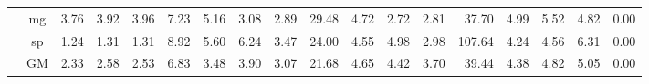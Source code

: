 \begin{table*}[]
\begin{center}
{\begin{tabular}{|c|c|rrrr|rrrr|rrrr|rrrr|}
 &  mg  &  3.76  &  3.92  &  3.96  &   7.23  &  5.16  & \cellcolor{blue!25} 3.08  & \cellcolor{blue!25} 2.89  &  29.48  &  4.72  & \cellcolor{blue!25} 2.72  &  2.81  &   37.70  &  4.99  &  5.52  & \cellcolor{blue!25} 4.82  &   0.00 \\
 &  sp  &  1.24  &  1.31  &  1.31  &   8.92  &  5.60  &  6.24  & \cellcolor{blue!25} 3.47  &  24.00  &  4.55  &  4.98  & \cellcolor{blue!25} 2.98  &  107.64  &  4.24  &  4.56  &  6.31  &   0.00 \\ \cline{2-18}
 &  GM  &  2.33  &  2.58  & \cellcolor{blue!25} 2.53  &   6.83  &  3.48  &  3.90  & \cellcolor{blue!25} 3.07  &  21.68  &  4.65  & \cellcolor{blue!25} 4.42  & \cellcolor{blue!25} 3.70  &   39.44  &  4.38  &  4.82  &  5.05  &   0.00 \\
\hline 
\end{tabular} }

\end{center}
\end{table*}
